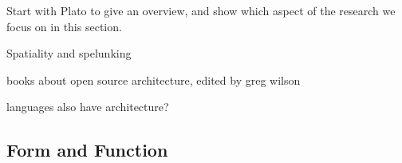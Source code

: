 

Start with Plato to give an overview, and show which aspect of the research we focus on in this section.

Spatiality and spelunking

books about open source architecture, edited by greg wilson

languages also have architecture?


\subsection{Form and Function}
\label{subsec:form-function}


